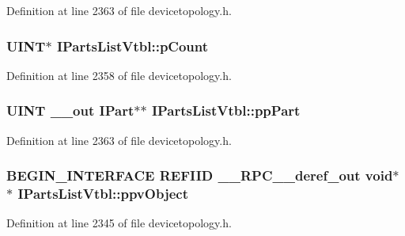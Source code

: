 Definition at line 2363 of file devicetopology.\+h.

\subsubsection[{\texorpdfstring{p\+Count}{pCount}}]{ {\bf U\+I\+NT}$\ast$ I\+Parts\+List\+Vtbl\+::p\+Count}\hypertarget{struct_i_parts_list_vtbl_aa5fa48419eddb181e7b5a7c5127bfcf0}{}\label{struct_i_parts_list_vtbl_aa5fa48419eddb181e7b5a7c5127bfcf0}


Definition at line 2358 of file devicetopology.\+h.

\subsubsection[{\texorpdfstring{pp\+Part}{ppPart}}]{ {\bf U\+I\+NT} {\bf \+\_\+\+\_\+out} {\bf I\+Part}$\ast$$\ast$ I\+Parts\+List\+Vtbl\+::pp\+Part}\hypertarget{struct_i_parts_list_vtbl_a9dd761b0866c5440cb8016ee8756a679}{}\label{struct_i_parts_list_vtbl_a9dd761b0866c5440cb8016ee8756a679}


Definition at line 2363 of file devicetopology.\+h.

\subsubsection[{\texorpdfstring{ppv\+Object}{ppvObject}}]{\setlength{\rightskip}{0pt plus 5cm}B\+E\+G\+I\+N\+\_\+\+I\+N\+T\+E\+R\+F\+A\+CE {\bf R\+E\+F\+I\+ID} {\bf \+\_\+\+\_\+\+R\+P\+C\+\_\+\+\_\+deref\+\_\+out} {\bf void}$\ast$$\ast$ I\+Parts\+List\+Vtbl\+::ppv\+Object}\hypertarget{struct_i_parts_list_vtbl_a9686d042884915b00bb6ce3bad267549}{}\label{struct_i_parts_list_vtbl_a9686d042884915b00bb6ce3bad267549}


Definition at line 2345 of file devicetopology.\+h.

